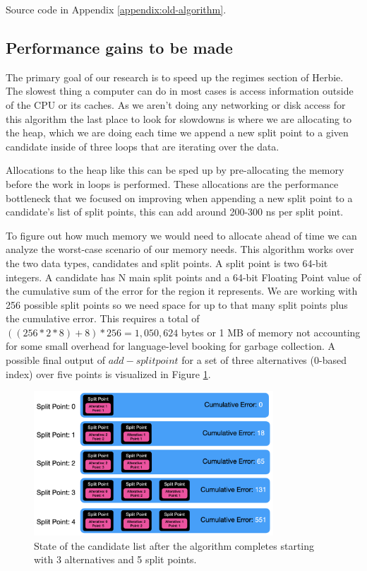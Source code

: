 \documentclass{article}
\begin{document}
Source code in Appendix \ref{appendix:old-algorithm}.


\subsection{Performance gains to be made}
The primary goal of our research is to speed up the regimes section of Herbie. The slowest thing a computer can do in most cases is access information outside of the CPU or its caches. As we aren't doing any networking or disk access for this algorithm the last place to look for slowdowns is where we are allocating to the heap, which we are doing each time we append a new split point to a given candidate inside of three loops that are iterating over the data. 

Allocations to the heap like this can be sped up by pre-allocating the memory before the work in loops is performed. These allocations are the performance bottleneck that we focused on improving when appending a new split point to a candidate's list of split points, this can add around 200-300 ns per split point.

To figure out how much memory we would need to allocate ahead of time we can analyze the worst-case scenario of our memory needs. This algorithm works over the two data types, candidates and split points. A split point is two 64-bit integers. A candidate has N main split points and a 64-bit Floating Point value of the cumulative sum of the error for the region it represents. We are working with 256 possible split points so we need space for up to that many split points plus the cumulative error. This requires a total of $((256 * 2 *8) + 8) * 256 = 1,050,624$ bytes or 1 MB of memory not accounting for some small overhead for language-level booking for garbage collection. A possible final output of $add-splitpoint$ for a set of three alternatives (0-based index) over five points is visualized in Figure \ref{fig:candidate-list}.

\begin{figure}[htbp]
\begin{center}
\includegraphics[width=0.8\textwidth]{candidate-list.png}
\caption{State of the candidate list after the algorithm completes starting with 3 alternatives and 5 split points.}
\label{fig:candidate-list} 
\end{center}
\end{figure}
\end{document}
